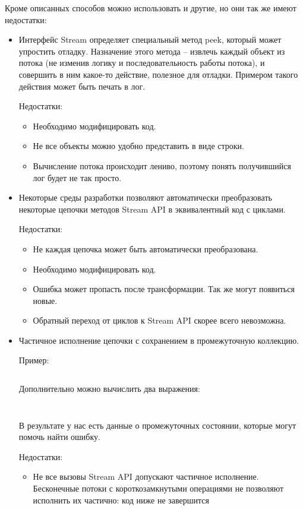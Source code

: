 Кроме описанных способов можно использовать и другие, но они так же имеют недостатки:
\begin{itemize}
	\item Интерфейс Stream определяет специальный метод peek, который может упростить отладку. Назначение этого метода -- извлечь каждый объект из потока (не изменив логику и последовательность работы потока), и совершить в ним какое-то действие, полезное для отладки. Примером такого действия может быть печать в лог. 
	
	Недостатки: 
	\begin{itemize}
		\item Необходимо модифицировать код.
		\item Не все объекты можно удобно представить в виде строки.
		\item Вычисление потока происходит лениво, поэтому понять получившийся лог будет не так просто.
	\end{itemize}

	\item Некоторые среды разработки позволяют автоматически преобразовать некоторые цепочки методов Stream API в эквивалентный код с циклами. 
	
	Недостатки:
	\begin{itemize}
		\item Не каждая цепочка может быть автоматически преобразована.
		\item Необходимо модифицировать код.
		\item Ошибка может пропасть после трансформации. Так же могут появиться новые.
		\item Обратный переход от циклов к Stream API скорее всего невозможна.
	\end{itemize}
	
	\item Частичное исполнение цепочки с сохранением в промежуточную коллекцию.
	
	Пример: 
	\inputminted{java}{chapter1/code/PartialEvaluationFull.java}
	Дополнительно можно вычислить два выражения:
	\inputminted{java}{chapter1/code/PartialEvaluation1.java}
	\inputminted{java}{chapter1/code/PartialEvaluation2.java}
	В результате у нас есть данные о промежуточных состоянии, которые могут помочь найти ошибку.
	
	Недостатки:
	\begin{itemize}
		\item Не все вызовы Stream API допускают частичное исполнение. Бесконечные потоки с короткозамкнутыми операциями не позволяют исполнить их частично: код ниже не завершится
		

\end{itemize}
\end{itemize}
